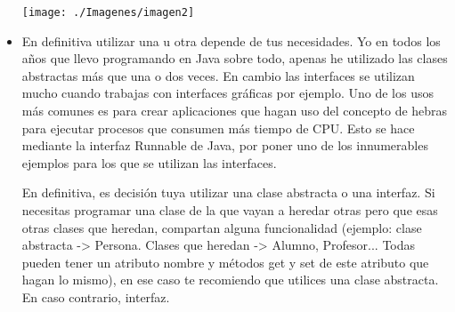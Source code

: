 \begin{itemize}
	\begin{center}
	\texttt{[image: ./Imagenes/imagen2]} 
	\end{center}

	\item En definitiva utilizar una u otra depende de tus necesidades. Yo en todos los años que llevo programando en Java sobre todo, apenas he utilizado las clases abstractas más que una o dos veces. En cambio las interfaces se utilizan mucho cuando trabajas con interfaces gráficas por ejemplo. Uno de los usos más comunes es para crear aplicaciones que hagan uso del concepto de hebras para ejecutar procesos que consumen más tiempo de CPU. Esto se hace mediante la interfaz Runnable de Java, por poner uno de los innumerables ejemplos para los que se utilizan las interfaces.

En definitiva, es decisión tuya utilizar una clase abstracta o una interfaz. Si necesitas programar una clase de la que vayan a heredar otras pero que esas otras clases que heredan, compartan alguna funcionalidad (ejemplo: clase abstracta -> Persona. Clases que heredan -> Alumno, Profesor... Todas pueden tener un atributo nombre y métodos get y set de este atributo que hagan lo mismo), en ese caso te recomiendo que utilices una clase abstracta. En caso contrario, interfaz.



\end{itemize} 